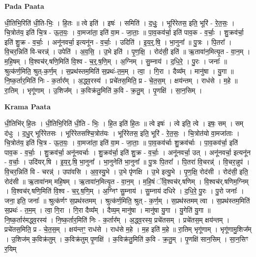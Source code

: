 \documentclass[17pt]{extarticle}
\begin{document}
\textbf{Pada Paata} \newline

धी॒तिभि॒रिति॑ धी॒ति-भिः॒ । हि॒तः ॥ त्वे इति॑ । इषः॑ । समिति॑ । द॒धुः॒ । भूरि॑रेतस॒ इति॒ भूरि॑ - रे॒त॒सः॒ । चि॒त्रोत॑य॒ इति॑ चि॒त्र - ऊ॒त॒यः॒ । वा॒मजा॑ता॒ इति॑ वा॒म - जा॒ताः॒ ॥ पा॒व॒कव॑र्चा॒ इति॑ पाव॒क - व॒र्चाः॒ । शु॒क्रव॑र्चा॒ इति॑ शु॒क्र - व॒र्चाः॒ । अनू॑नवर्चा॒ इत्यनू॑न - व॒र्चाः॒ । उदिति॑ । इ॒य॒र्॒.षि॒ । भा॒नुना᳚ ॥ पु॒त्रः । पि॒तरा᳚ । वि॒चर॒न्निति॑ वि-चरन्न्॑ । उपेति॑ । अ॒व॒सि॒ । उ॒भे इति॑ । पृ॒ण॒क्षि॒ । रोद॑सी॒ इति॑ ॥ ऋ॒तावा॑न॒मित्यृ॒त - वा॒न॒म् । म॒हि॒षम् । वि॒श्वच॑र्.षणि॒मिति॑ वि॒श्व - च॒र्॒.ष॒णि॒म् । अ॒ग्निम् । सु॒म्नाय॑ । द॒धि॒रे॒ । पु॒रः । जनाः᳚ ॥ श्रुत्क॑र्ण॒मिति॒ श्रुत्-क॒र्ण॒म् । स॒प्रथ॑स्तम॒मिति॑ स॒प्रथः॑-त॒म॒म् । त्वा॒ । गि॒रा । दैव्य᳚म् । मानु॑षा । यु॒गा ॥ नि॒ष्क॒र्तार॒मिति॑ निः - क॒र्तार᳚म् । अ॒द्ध्व॒रस्य॑ । प्रचे॑तस॒मिति॒ प्र - चे॒त॒स॒म् । क्षय॑न्तम् । राध॑से । म॒हे ॥ रा॒तिम् । भृगू॑णाम् । उ॒शिज᳚म् । क॒विक्र॑तु॒मिति॑ क॒वि - क्र॒तु॒म् । पृ॒णक्षि॑ । सा॒न॒सिम् ।  \newline


\textbf{Krama Paata} \newline

धी॒तिभि॑र् हि॒तः । धी॒तिभि॒रिति॑ धी॒ति - भिः॒ । हि॒त इति॑ हि॒तः ॥ त्वे इषः॑ । त्वे इति॒ त्वे । इषः॒ सम् । सम् द॑धुः । द॒धु॒र् भूरि॑रेतसः । भूरि॑रेतसश्चि॒त्रोत॑यः । भूरि॑रेतस॒ इति॒ भूरि॑ - रे॒त॒सः॒ । चि॒त्रोत॑यो वा॒मजा॑ताः । चि॒त्रोत॑य॒ इति॑ चि॒त्र - ऊ॒त॒यः॒ । वा॒मजा॑ता॒ इति॑ वा॒म - जा॒ताः॒ ॥ पा॒व॒कव॑र्चाः शु॒क्रव॑र्चाः । पा॒व॒कव॑र्चा॒ इति॑ पाव॒क - व॒र्चाः॒ । शु॒क्रव॑र्चा॒ अनू॑नवर्चाः । शु॒क्रव॑र्चा॒ इति॑ शु॒क्र - व॒र्चाः॒ । अनू॑नवर्चा॒ उत् । अनू॑नवर्चा॒ इत्यनू॑न - व॒र्चाः॒ । उदि॑यर्.षि । इ॒य॒र्॒.षि॒ भा॒नुना᳚ । भा॒नुनेति॑ भा॒नुना᳚ ॥ पु॒त्रः पि॒तरा᳚ । पि॒तरा॑ वि॒चरन्न्॑ । वि॒चर॒न्नुप॑ । वि॒चर॒न्निति॑ वि - चरन्न्॑ । उपा॑वसि । अ॒व॒स्यु॒भे । उ॒भे पृ॑णक्षि । उ॒भे इत्यु॒भे । पृ॒ण॒क्षि॒ रोद॑सी । रोद॑सी॒ इति॒ रोद॑सी ॥ ऋ॒तावा॑नम् महि॒षम् । ऋ॒तावा॑न॒मित्यृ॒त - वा॒न॒म् । म॒हि॒षं ॅवि॒श्वच॑र्.षणिम् । वि॒श्वच॑र्.षणिम॒ग्निम् । वि॒श्वच॑र्.षणि॒मिति॑ वि॒श्व - च॒र्॒.ष॒णि॒म् । अ॒ग्निꣳ सु॒म्नाय॑ । सु॒म्नाय॑ दधिरे । द॒धि॒रे॒ पु॒रः । पु॒रो जनाः᳚ । जना॒ इति॒ जनाः᳚ ॥ श्रुत्क॑र्णꣳ स॒प्रथ॑स्तमम् । श्रुत्क॑र्ण॒मिति॒ श्रुत् - क॒र्ण॒म् । स॒प्रथ॑स्तमम् त्वा । स॒प्रथ॑स्तम॒मिति॑ स॒प्रथः॑ - त॒म॒म् । त्वा॒ गि॒रा । गि॒रा दैव्य᳚म् । दैव्य॒म् मानु॑षा । मानु॑षा यु॒गा । यु॒गेति॑ यु॒गा ॥ नि॒ष्क॒र्तार॑मद्ध्व॒रस्य॑ । नि॒ष्क॒र्तार॒मिति॑ निः - क॒र्तार᳚म् । अ॒द्ध्व॒रस्य॒ प्रचे॑तसम् । प्रचे॑तस॒म् क्षय॑न्तम् । प्रचे॑तस॒मिति॒ प्र - चे॒त॒स॒म् । क्षय॑न्तꣳ॒॒ राध॑से । राध॑से म॒हे । म॒ह इति॑ म॒हे ॥ रा॒तिम् भृगू॑णाम् । भृगू॑णामु॒शिज᳚म् । उ॒शिज॑म् क॒विक्र॑तुम् । क॒विक्र॑तुम् पृ॒णक्षि॑ । क॒विक्र॑तु॒मिति॑ क॒वि - क्र॒तु॒म् । पृ॒णक्षि॑ सान॒सिम् । सा॒न॒सिꣳ र॒यिम् \newline
\end{document}
